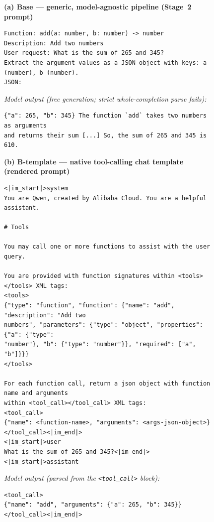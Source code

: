 \begin{figure}[ht]
\centering
{}

\textbf{(a) Base --- generic, model-agnostic pipeline (Stage~2 prompt)}
\begin{lstlisting}[style=promptbox]
Function: add(a: number, b: number) -> number
Description: Add two numbers
User request: What is the sum of 265 and 345?
Extract the argument values as a JSON object with keys: a (number), b (number).
JSON:
\end{lstlisting}
\textit{Model output (free generation; strict whole-completion parse fails):}
\begin{lstlisting}[style=promptbox]
{"a": 265, "b": 345} The function `add` takes two numbers as arguments
and returns their sum [...] So, the sum of 265 and 345 is 610.
\end{lstlisting}

\vspace{4pt}
\textbf{(b) B-template --- native tool-calling chat template (rendered prompt)}
\begin{lstlisting}[style=promptbox]
<|im_start|>system
You are Qwen, created by Alibaba Cloud. You are a helpful assistant.

# Tools

You may call one or more functions to assist with the user query.

You are provided with function signatures within <tools></tools> XML tags:
<tools>
{"type": "function", "function": {"name": "add", "description": "Add two
numbers", "parameters": {"type": "object", "properties": {"a": {"type":
"number"}, "b": {"type": "number"}}, "required": ["a", "b"]}}}
</tools>

For each function call, return a json object with function name and arguments
within <tool_call></tool_call> XML tags:
<tool_call>
{"name": <function-name>, "arguments": <args-json-object>}
</tool_call><|im_end|>
<|im_start|>user
What is the sum of 265 and 345?<|im_end|>
<|im_start|>assistant
\end{lstlisting}
\textit{Model output (parsed from the \texttt{<tool\_call>} block):}
\begin{lstlisting}[style=promptbox]
<tool_call>
{"name": "add", "arguments": {"a": 265, "b": 345}}
</tool_call><|im_end|>
\end{lstlisting}


\end{figure}
